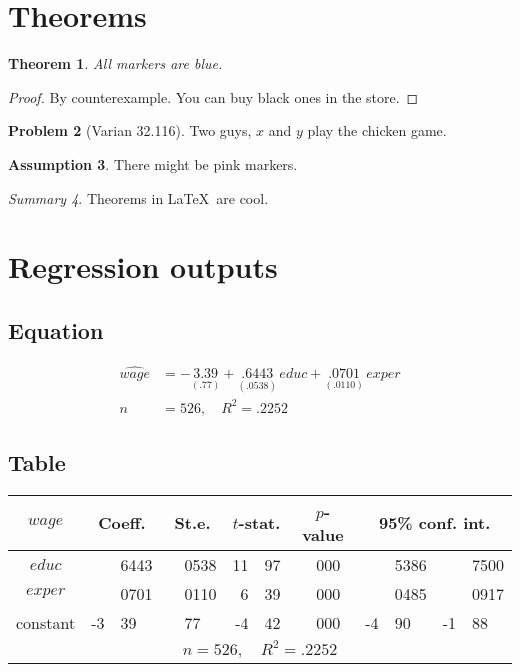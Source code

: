 \documentclass{article}			%
\newtheorem{theorem}{Theorem}[]
\theoremstyle{definition}
\newtheorem{problem}[theorem]{Problem}
\newtheorem{assumption}[theorem]{Assumption}
\theoremstyle{remark}
\newtheorem{summary}[theorem]{Summary}
\begin{document}
\section{Theorems}

\begin{theorem}
All markers are blue.
\end{theorem}
\begin{proof}
By counterexample.
You can buy black ones in the store.
\end{proof}
\begin{problem}[Varian 32.116]
Two guys, $x$ and $y$ play the chicken game.
\end{problem}
\setcounter{theorem}{0}
\begin{assumption}
There might be pink markers.
\end{assumption}
\addtocounter{theorem}{1}
\begin{summary}
Theorems in \LaTeX\ are cool.
\end{summary}

\section{Regression outputs}

\subsection{Equation}

\begin{align*}
\widehat{wage} &= - \underset{(.77)}{3.39} + \underset{(.0538)}{.6443} \, educ + \underset{(.0110)}{.0701} \, exper \\
n &= 526, \quad R^2 = .2252
\end{align*}

\subsection{Table}

\begin{table}[H]
\centering
\begin{tabular}{cr@{.}lr@{.}lr@{.}lr@{.}lr@{.}lr@{.}l}
\hline 
$wage$ & \multicolumn{2}{c}{Coeff.} & \multicolumn{2}{c}{St.e.} & \multicolumn{2}{c}{$t$-stat.} & \multicolumn{2}{c}{$p$-value} & \multicolumn{4}{c}{95\% conf. int.} \\ 
\hline 
$educ$   &   &6443 & &0538 &  11&97 & &000 &   &5386 &   &7500 \\ 
$exper$  &   &0701 & &0110 &  6&39  & &000 &   &0485 &   &0917 \\ 
constant & -3&39   & &77   & -4&42  & &000 & -4&90   & -1&88 \\
\hline
\multicolumn{13}{c}{$n=526, \quad R^2 = .2252$}
\end{tabular} 
\end{table}
\end{document}
